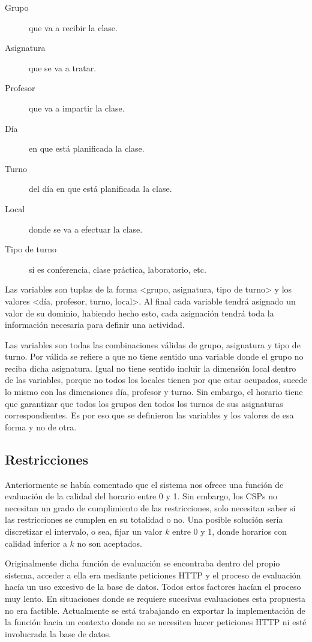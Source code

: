 \begin{description}
	\item[Grupo] que va a recibir la clase.
	\item[Asignatura] que se va a tratar.
	\item[Profesor] que va a impartir la clase.
	\item[D\'ia] en que está planificada la clase.
	\item[Turno] del d\'ia en que está planificada la clase.
	\item[Local] donde se va a efectuar la clase.
	\item[Tipo de turno] si es conferencia, clase pr\'actica, laboratorio, etc.
\end{description}

Las variables son tuplas de la forma \textsf{<grupo, asignatura, tipo de turno>} y los valores \textsf{<día, profesor, turno, local>}. Al final cada variable tendr\'a asignado un valor de su dominio, habiendo hecho esto, cada asignaci\'on tendr\'a toda la informaci\'on necesaria para definir una actividad.

Las variables son todas las combinaciones v\'alidas de grupo, asignatura y tipo de turno. Por v\'alida se refiere a que no tiene sentido una variable donde el grupo no reciba dicha asignatura. Igual no tiene sentido incluir la dimensi\'on local dentro de las variables, porque no todos los locales tienen por que estar ocupados, sucede lo mismo con las dimensiones d\'ia, profesor y turno. Sin embargo, el horario tiene que garantizar que todos los grupos den todos los turnos de sus asignaturas correspondientes. Es por eso que se definieron las variables y los valores de esa forma y no de otra. 

\subsection{Restricciones}

Anteriormente se hab\'ia comentado que el sistema nos ofrece una funci\'on de evaluaci\'on de la calidad del horario entre 0 y 1. Sin embargo, los CSPs no necesitan un grado de cumplimiento de las restricciones, solo necesitan saber si las restricciones se cumplen en su totalidad o no. Una posible soluci\'on ser\'ia discretizar el intervalo, o sea, fijar un valor $k$ entre 0 y 1, donde horarios con calidad inferior a $k$ no son aceptados.

Originalmente dicha funci\'on de evaluaci\'on se encontraba dentro del propio sistema, acceder a ella era mediante peticiones HTTP y el proceso de evaluaci\'on hac\'ia un uso excesivo de la base de datos. Todos estos factores hac\'ian el proceso muy lento. En situaciones donde se requiere sucesivas evaluaciones esta propuesta no era factible. Actualmente se est\'a trabajando en exportar la implementaci\'on de la funci\'on hacia un contexto donde no se necesiten hacer peticiones HTTP ni est\'e involucrada la base de datos.

